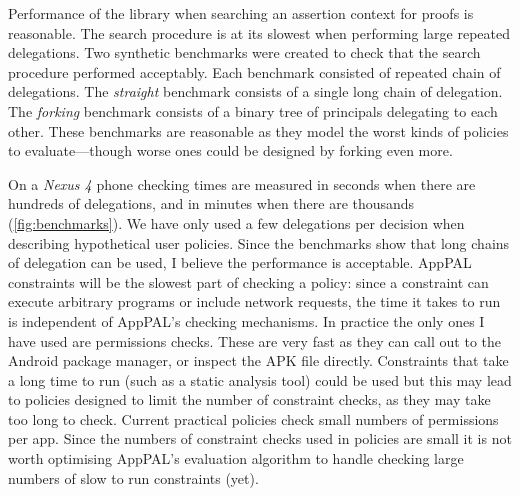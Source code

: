 \documentclass[a4paper]{scrartcl}
\begin{document}
Performance of the library when searching an assertion context for proofs is reasonable.
The search procedure is at its slowest when performing large repeated delegations.
Two synthetic benchmarks were created to check that the search procedure performed acceptably.
Each benchmark consisted of repeated chain of delegations.
The \emph{straight} benchmark consists of a single long chain of delegation.
The \emph{forking} benchmark consists of a binary tree of principals delegating to each other.
These benchmarks are reasonable as they model the worst kinds of policies to evaluate---though worse ones could be designed by forking even more.

On a \emph{Nexus 4} phone checking times are measured in seconds when there are hundreds of delegations, and in minutes when there are thousands (\autoref{fig:benchmarks}).
We have only used a few delegations per decision when describing hypothetical user policies.
Since the benchmarks show that long chains of delegation can be used, I believe the performance is acceptable.
AppPAL constraints will be the slowest part of checking a policy:
  since a constraint can execute arbitrary programs or include network requests, the time it takes to run is independent of AppPAL's checking mechanisms.
In practice the only ones I have used are permissions checks.
These are very fast as they can call out to the Android package manager, or inspect the APK file directly.
Constraints that take a long time to run (such as a static analysis tool) could be used but this may lead to policies designed to limit the number of constraint checks, as they may take too long to check.
Current practical policies check small numbers of permissions per app.
Since the numbers of constraint checks used in policies are small it is not worth optimising AppPAL's evaluation algorithm to handle checking large numbers of slow to run constraints (yet).
\end{document}
